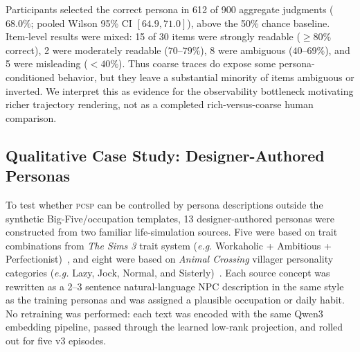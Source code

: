 \documentclass[conference]{IEEEtran}
\newcommand{\PCSP}{\textsc{pcsp}\xspace}
\newcommand{\eg}{\textit{e.g.}\xspace}
\begin{document}
Participants selected the correct persona in 612 of 900 aggregate judgments
($68.0\%$; pooled Wilson 95\% CI $[64.9, 71.0]$), above the 50\% chance
baseline. Item-level results were mixed: 15 of 30 items were strongly readable
($\geq 80\%$ correct), 2 were moderately readable ($70$--$79\%$), 8 were
ambiguous ($40$--$69\%$), and 5 were misleading ($<40\%$). Thus coarse traces
do expose some persona-conditioned behavior, but they leave a substantial
minority of items ambiguous or inverted. We interpret this as evidence for the
observability bottleneck motivating richer trajectory rendering, not as a
completed rich-versus-coarse human comparison.

\subsection{Qualitative Case Study: Designer-Authored Personas}
\label{sec:qualcase}

To test whether \PCSP can be controlled by persona descriptions outside the
synthetic Big-Five/occupation templates, 13 designer-authored personas were
constructed from two familiar life-simulation sources. Five were based on
trait combinations from \textit{The Sims 3} trait system
(\eg Workaholic + Ambitious + Perfectionist)~\cite{sims3traits}, and eight were
based on \textit{Animal Crossing} villager personality categories
(\eg Lazy, Jock, Normal, and Sisterly)~\cite{nookipediaVillager}. Each source
concept was rewritten as a 2--3 sentence natural-language NPC description in
the same style as the training personas and was assigned a plausible occupation
or daily habit. No retraining was performed: each text was encoded with the same
Qwen3 embedding pipeline, passed through the learned low-rank projection, and rolled
out for five v3 episodes.
\end{document}
